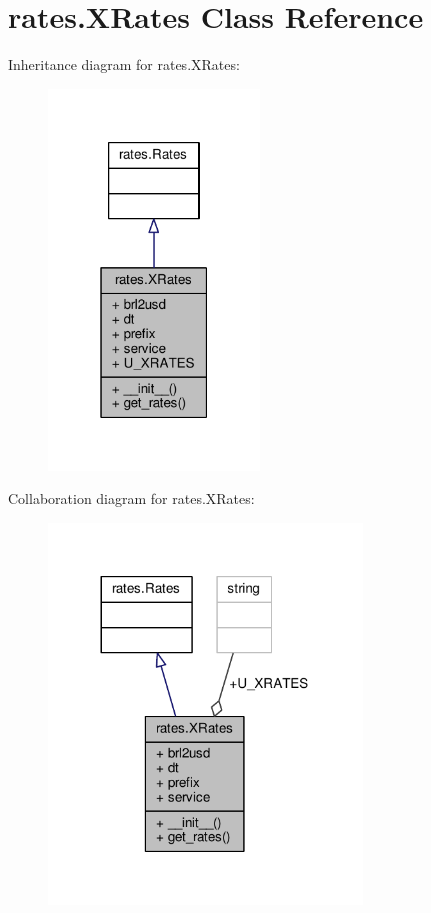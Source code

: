 \hypertarget{classrates_1_1_x_rates}{}\section{rates.\+X\+Rates Class Reference}
\label{classrates_1_1_x_rates}


Inheritance diagram for rates.\+X\+Rates\+:\nopagebreak
\begin{figure}[H]
\begin{center}
\leavevmode
\includegraphics[width=159pt]{classrates_1_1_x_rates__inherit__graph}
\end{center}
\end{figure}


Collaboration diagram for rates.\+X\+Rates\+:\nopagebreak
\begin{figure}[H]
\begin{center}
\leavevmode
\includegraphics[width=236pt]{classrates_1_1_x_rates__coll__graph}
\end{center}
\end{figure}

